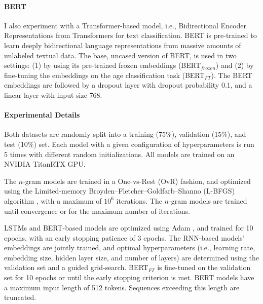 \paragraph{BERT} 
I also experiment with a Transformer-based model, i.e., 
Bidirectional Encoder Representations from Transformers \cite[BERT;][]{devlin-etal-2019-bert} for text classification.
BERT is pre-trained to learn deeply bidirectional language representations from massive amounts of unlabeled textual data. 
The base, uncased version of BERT, is used in two settings: (1) by using its 
pre-trained frozen embeddings (BERT$_{frozen}$) and (2) by fine-tuning the embeddings on the age classification task (BERT$_{FT}$).
The BERT embeddings are followed by a dropout layer with dropout probability 0.1, and a linear layer with input size 768.

\paragraph{Experimental Details} %

Both datasets are randomly split into a training (75\%), validation (15\%), and test (10\%) set.
Each model with a given configuration of hyperparameters is run 5 times with different random initializations. All models are trained on an NVIDIA TitanRTX GPU.

The $n$-gram models are trained in a One-vs-Rest (OvR) fashion, and optimized using the Limited-memory Broyden–Fletcher–Goldfarb–Shanno (L-BFGS) algorithm \citep{liu1989limited}, with a maximum of $10^6$ iterations. The $n$-gram models are trained until convergence or for the maximum number of iterations.

LSTMs and BERT-based models
are optimized using Adam \citep{DBLP:journals/corr/KingmaB14}, and trained for 10 epochs, with an early stopping patience of 3 epochs.
The RNN-based models' embeddings are jointly trained, and optimal hyperparameters (i.e., learning rate, embedding size, hidden layer size, and number of layers)  are determined using the validation set and a guided grid-search. %
BERT$_{FT}$ is fine-tuned on the validation set for 10 epochs or until the early stopping criterion is met.
BERT models have a maximum input length of 512 tokens. Sequences exceeding this length are truncated.